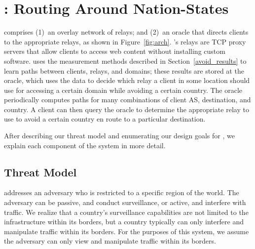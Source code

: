 \section{\system{}: Routing Around Nation-States}
\label{system_design}

\system{} comprises (1)~an overlay network of relays; and (2)~an oracle that
directs clients to the appropriate relays, as shown in Figure~\ref{fig:arch}.
\system{}'s relays are TCP proxy servers that allow clients to access web
content without installing custom software. \system{} uses the measurement
methods described in Section~\ref{avoid_results} to learn paths between
clients, relays, and domains; these results are stored at the oracle, which
uses the data to decide which relay a client in some location should use for
accessing a certain domain while avoiding a certain country.  The oracle
periodically computes paths for many combinations of client AS, destination,
and country.   A client can then query the oracle to determine the appropriate
relay to use to avoid a certain country en route to a particular destination.

After describing our threat model and enumerating our design goals for \system{}, we explain each component of
the system in more detail. 



\subsection{Threat Model}

\system{} addresses an adversary who is restricted to a specific region of the world.  The 
adversary can be passive, and conduct surveillance, or active, and interfere with traffic. We 
realize that a country's surveillance capabilities are not limited to the infrastructure within 
its borders, but a country typically can only interfere and manipulate traffic within its borders. 
For the purposes of this system, we assume the adversary can only view and manipulate traffic 
within its borders.

